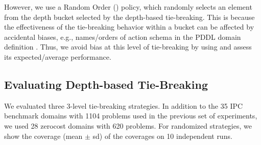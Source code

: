 However, 
we use a Random Order (\ro) policy, which 
randomly selects an element from the depth bucket selected by the depth-based tie-breaking.
This is because the effectiveness of the tie-breaking behavior within a bucket
can be affected by accidental biases, e.g., names/orders of action schema in the PDDL domain
definition \cite{vallati2015effective}.
Thus, we avoid bias at this level of tie-breaking by using \ro and assess its expected/average
performance.





\subsection{Evaluating Depth-based Tie-Breaking}
\label{sec:depth-based-evaluation}
We evaluated three 3-level tie-breaking strategies.
% 
In addition to the 35 IPC benchmark domains with 1104 problems used in
the previous set of experiments, we used 28 zerocost domains with 620
problems. For randomized strategies, we
show the coverage (mean $\pm$ sd) of the coverages on
10 independent runs.


